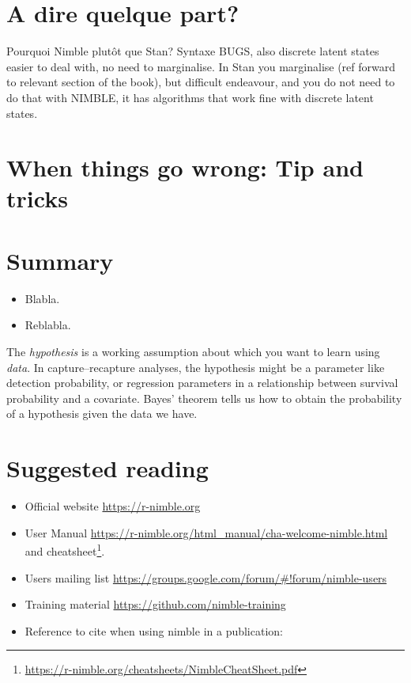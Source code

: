 \documentclass[
  12pt,
]{krantz}
\makeatletter
\renewcommand{\href}[2]{#2\footnote{\url{#1}}}
\newenvironment{kframe}{%
\medskip{}
\setlength{\fboxsep}{.8em}
 \def\at@end@of@kframe{}%
 \ifinner\ifhmode%
  \def\at@end@of@kframe{\end{minipage}}%
  \begin{minipage}{\columnwidth}%
 \fi\fi%
 \def\FrameCommand##1{\hskip\@totalleftmargin \hskip-\fboxsep
 \colorbox{shadecolor}{##1}\hskip-\fboxsep
     \hskip-\linewidth \hskip-\@totalleftmargin \hskip\columnwidth}%
 \MakeFramed {\advance\hsize-\width
   \@totalleftmargin\z@ \linewidth\hsize
   \@setminipage}}%
 {\par\unskip\endMakeFramed%
 \at@end@of@kframe}
\newenvironment{rmdblock}[1]
  {
  \begin{itemize}
  \renewcommand{\labelitemi}{
    \raisebox{-.7\height}[0pt][0pt]{
      {\setkeys{Gin}{width=3em,keepaspectratio}\texttt{[image: images/\#1]}}
    }
  }
  \setlength{\fboxsep}{1em}
  \begin{kframe}
  \item
  }
  {
  \end{kframe}
  \end{itemize}
  }
\newenvironment{rmdnote}
  {\begin{rmdblock}{note}}
  {\end{rmdblock}}
\makeatother
\begin{document}
\hypertarget{a-dire-quelque-part}{%
\section{A dire quelque part?}\label{a-dire-quelque-part}}

Pourquoi Nimble plutôt que Stan? Syntaxe BUGS, also discrete latent states easier to deal with, no need to marginalise. In Stan you marginalise (ref forward to relevant section of the book), but difficult endeavour, and you do not need to do that with NIMBLE, it has algorithms that work fine with discrete latent states.

\hypertarget{when-things-go-wrong-tip-and-tricks}{%
\section{When things go wrong: Tip and tricks}\label{when-things-go-wrong-tip-and-tricks}}

\hypertarget{summary-1}{%
\section{Summary}\label{summary-1}}

\begin{itemize}
\item
  Blabla.
\item
  Reblabla.
\end{itemize}

\begin{rmdnote}
The \emph{hypothesis} is a working assumption about which you want to learn using \emph{data}. In capture--recapture analyses, the hypothesis might be a parameter like detection probability, or regression parameters in a relationship between survival probability and a covariate. Bayes' theorem tells us how to obtain the probability of a hypothesis given the data we have.
\end{rmdnote}

\hypertarget{suggested-reading-1}{%
\section{Suggested reading}\label{suggested-reading-1}}

\begin{itemize}
\item
  Official website \url{https://r-nimble.org}
\item
  User Manual \url{https://r-nimble.org/html_manual/cha-welcome-nimble.html} and \href{https://r-nimble.org/cheatsheets/NimbleCheatSheet.pdf}{cheatsheet}.
\item
  Users mailing list \url{https://groups.google.com/forum/\#!forum/nimble-users}
\item
  Training material \url{https://github.com/nimble-training}
\item
  Reference to cite when using nimble in a publication:
\end{itemize}
\end{document}
